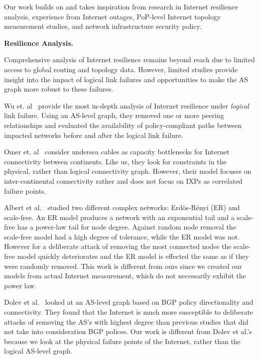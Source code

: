 Our work builds on and takes inspiration from research in Internet resilience
analysis, experience from Internet outages, PoP-level Internet topology
measurement studies, and network infrastructure security policy.

{\bf Resilience Analysis.}

    Comprehensive analysis of Internet resilience remains beyond reach due to
    limited access to global routing and topology data.  However, limited
    studies provide insight into the impact of logical link failures and
    opportunities to make the AS graph more robust to these failures.
    
    Wu et. al~\cite{michigan} provide the most in-depth analysis of Internet
    resilience under {\it logical} link failure.  Using an AS-level graph, they
    removed one or more peering relationships and evaluated the availability of
    policy-compliant paths between impacted networks before and after the
    logical link failure.

    Omer et. al~\cite{measuringresilience} consider undersea cables as capacity
    bottlenecks for Internet connectivity between continents.  Like us, they
    look for constraints in the physical, rather than logical connectivity
    graph.  However, their model focuses on inter-continental connectivity
    rather and does not focus on IXPs as correlated failure points.

    Albert et al.~\cite{resilience-complex-networks} studied two different
    complex networks: Erd\"{o}s-R\'{e}nyi (ER) and scale-free. An ER model
    produces a network with an exponential tail and a scale-free has a power-law
    tail for node degree. Against random node removal the scale-free model had a
    high degree of tolerance, while the ER model was not. However for a
    deliberate attack of removing the most connected nodes the scale-free model
    quickly deteriorates and the ER model is effected the same as if they were
    randomly removed. This work is different from ours since we created our
    models from actual Internet measurement, which do not necessarily exhibit
    the power law.

    Dolev et al.~\cite{resilience-under-BGP} looked at an AS-level graph based
    on BGP policy directionality and connectivity. They found that the Internet
    is much more susceptible to deliberate attacks of removing the AS's with
    highest degree than previous studies that did not take into consideration
    BGP polices. Our work is different from Dolev et al.'s because we look at
    the physical failure points of the Internet, rather than the logical
    AS-level graph.
    
